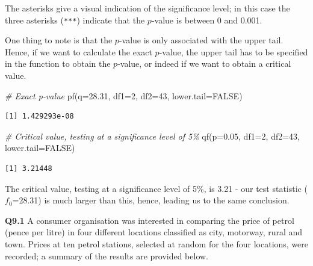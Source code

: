 \documentclass[
  oneside]{krantz}
\newenvironment{Shaded}{\begin{snugshade}}{\end{snugshade}}
\newcommand{\AttributeTok}[1]{\textcolor[rgb]{0.77,0.63,0.00}{#1}}
\newcommand{\CommentTok}[1]{\textcolor[rgb]{0.56,0.35,0.01}{\textit{#1}}}
\newcommand{\ConstantTok}[1]{\textcolor[rgb]{0.00,0.00,0.00}{#1}}
\newcommand{\DecValTok}[1]{\textcolor[rgb]{0.00,0.00,0.81}{#1}}
\newcommand{\FloatTok}[1]{\textcolor[rgb]{0.00,0.00,0.81}{#1}}
\newcommand{\FunctionTok}[1]{\textcolor[rgb]{0.00,0.00,0.00}{#1}}
\newcommand{\NormalTok}[1]{#1}
\begin{document}
The asterisks give a visual indication of the significance level; in this case the three asterisks (\texttt{***}) indicate that the \(p\)-value is between 0 and 0.001.

One thing to note is that the \(p\)-value is only associated with the upper tail. Hence, if we want to calculate the exact \(p\)-value, the upper tail has to be specified in the function to obtain the \(p\)-value, or indeed if we want to obtain a critical value.

\begin{Shaded}
\begin{Highlighting}[]
\CommentTok{\# Exact p{-}value}
\FunctionTok{pf}\NormalTok{(}\AttributeTok{q=}\FloatTok{28.31}\NormalTok{, }\AttributeTok{df1=}\DecValTok{2}\NormalTok{, }\AttributeTok{df2=}\DecValTok{43}\NormalTok{, }\AttributeTok{lower.tail=}\ConstantTok{FALSE}\NormalTok{)}
\end{Highlighting}
\end{Shaded}

\begin{verbatim}
[1] 1.429293e-08
\end{verbatim}

\begin{Shaded}
\begin{Highlighting}[]
\CommentTok{\# Critical value, testing at a significance level of 5\%}
\FunctionTok{qf}\NormalTok{(}\AttributeTok{p=}\FloatTok{0.05}\NormalTok{, }\AttributeTok{df1=}\DecValTok{2}\NormalTok{, }\AttributeTok{df2=}\DecValTok{43}\NormalTok{, }\AttributeTok{lower.tail=}\ConstantTok{FALSE}\NormalTok{)}
\end{Highlighting}
\end{Shaded}

\begin{verbatim}
[1] 3.21448
\end{verbatim}

The critical value, testing at a significance level of 5\%, is 3.21 - our test statistic (\(f_0\)=28.31) is much larger than this, hence, leading us to the same conclusion.

\textbf{Q9.1} A consumer organisation was interested in comparing the price of petrol (pence per litre) in four different locations classified as city, motorway, rural and town. Prices at ten petrol stations, selected at random for the four locations, were recorded; a summary of the results are provided below.
\end{document}
